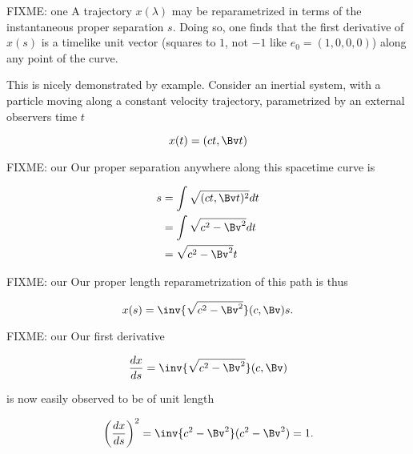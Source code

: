 FIXME: one
A trajectory $x(\lambda)$ may be reparametrized in terms of the instantaneous proper separation $s$.  Doing so, one finds that the first derivative of $x(s)$ is a timelike unit vector (squares to $1$, not $-1$ like $e_0 = (1, 0, 0, 0)$) along any point of the curve.

This is nicely demonstrated by example.
%
%
Consider an inertial system, with a particle moving along a constant velocity trajectory, parametrized by an external observers time $t$

\begin{equation}\label{eqn:grahamSchmidtLorentz:440}
x(t) = (c t, \Bv t)
\end{equation}

FIXME: our
Our proper separation anywhere along this spacetime curve is

\begin{equation}\label{eqn:grahamSchmidtLorentz:460}
\begin{aligned}
s
&= \int \sqrt{(c t, \Bv t)^2} dt  \\
&= \int \sqrt{ c^2 - \Bv^2 } dt  \\
&= \sqrt{ c^2 - \Bv^2 } t
\end{aligned}
\end{equation}

FIXME: our
Our proper length reparametrization of this path is thus

\begin{equation}\label{eqn:grahamSchmidtLorentz:480}
x(s) = \inv{\sqrt{c^2 - \Bv^2}} (c, \Bv) s.
\end{equation}

FIXME: our
Our first derivative

\begin{equation}\label{eqn:grahamSchmidtLorentz:500}
\frac{dx}{ds} = \inv{\sqrt{c^2 - \Bv^2}} (c, \Bv)
\end{equation}

is now easily observed to be of unit length

\begin{equation}\label{eqn:grahamSchmidtLorentz:520}
\left( \frac{dx}{ds} \right)^2 = \inv{c^2 - \Bv^2} (c^2 - \Bv^2) = 1.
\end{equation}

